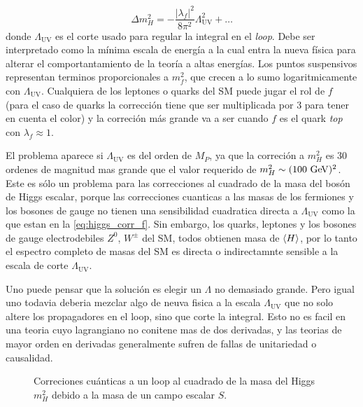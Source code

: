 \begin{equation}
  \Delta m_H^2 = -\frac{|\lambda_f|^2}{8\pi^2} \Lambda^2_\text{UV} + \ldots
  \label{eq:higgs_corr_f}
\end{equation}
%
donde $\Lambda_\text{UV}$ es el corte usado para regular la integral en el
\emph{loop}.
Debe ser interpretado como la m\'inima escala de energ\'ia a la cual entra
la nueva física para alterar el comportantamiento de la teoría a altas
energías. Los puntos suspensivos representan terminos proporcionales a
$m_f^2$, que crecen a lo sumo logaritmicamente con $\Lambda_\text{UV}$.
Cualquiera de los leptones o quarks del SM puede jugar el rol de $f$ (para
el caso de quarks la correcci\'on tiene que ser multiplicada por 3 para
tener en cuenta el color) y la correci\'on m\'as grande va a ser cuando
$f$ es el quark \emph{top} con $\lambda_f \approx 1$.

El problema aparece si $\Lambda_\text{UV}$ es del orden de $M_P$, ya que
la correci\'on a $m_H^2$ es 30 ordenes de magnitud mas grande que el valor
requerido de $m_H^2 \sim (100 \gev)^2$.
Este es sólo un problema para las correcciones al cuadrado de la masa del
bos\'on de Higgs escalar, porque las correcciones cuanticas a las masas de
los fermiones y los bosones de gauge no tienen una sensibilidad cuadratica
directa a $\Lambda_\text{UV}$ como la que estan en la \cref{eq:higgs_corr_f}.
Sin embargo, los quarks, leptones y los bosones de gauge electrodebiles
$Z^0$, $W^{\pm}$ del SM, todos obtienen masa de $\langle H \rangle$, por lo tanto el
espectro completo de masas del SM es directa o indirectamnte sensible a
la escala de corte $\Lambda_\text{UV}$.

Uno puede pensar que la soluci\'on es elegir un $\Lambda$ no demasiado
grande. Pero igual uno todavia deberia mezclar algo de neuva fisica
a la escala $\Lambda_\text{UV}$ que no solo altere los propagadores en
el loop, sino que corte la integral. Esto no es facil en una teoria cuyo
lagrangiano no conitene mas de dos derivadas, y las teorias de mayor orden
en derivadas generalmente sufren de fallas de unitariedad o causalidad.

\begin{figure}[h]
  \centering
  
  \caption{Correciones cu\'anticas a un loop al cuadrado de la masa del
    Higgs $m_H^2$ debido a la masa de un campo escalar $S$.}
  \label{fig:higgs_correction_s}
\end{figure}

